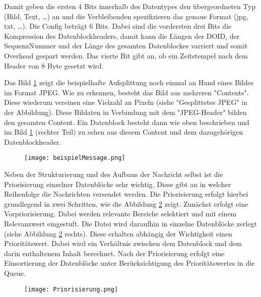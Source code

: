 Damit geben die ersten $4$ Bits innerhalb des Datentypes den übergeordneten Typ
(Bild, Text, \ldots) an und die Verbleibenden spezifizieren das genaue Format
(jpg, txt, \ldots). Die Config beträgt $6$ Bits. Dabei sind die vordersten drei
Bits die Kompression des Datenblockheaders, damit kann die Längen der DOID, der
SequenzNummer und der Länge des gesamten Datenblockes varriert und somit
Overhead gespart werden. Das vierte Bit gibt an, ob ein Zeitstempel nach dem
Header von $8$ Byte gesetzt wird.



Das Bild \ref{fig:beispielJPG} zeigt die beispielhafte Aufsplittung noch einmal
an Hand eines Bildes im Format JPEG. Wie zu erkennen, besteht das Bild aus
mehreren "Contents". Diese wiederum vereinen eine Vielzahl an Pixeln (siehe
"Gesplittetes JPEG" in der Abbildung). Diese Bildaten in Verbindung mit dem
"JPEG-Header" bilden den gesamten Content. Ein Datenblock besteht dann wie oben
beschrieben und im Bild \ref{fig:beispielJPG} (rechter Teil) zu sehen aus diesem
Content und dem dazugehörigen Datenblockheader.

\begin{figure}[H]
	\centering
	\texttt{[image: beispielMessage.png]}
	\label{fig:beispielJPG}
\end{figure}

Neben der Strukturierung und des Aufbaus der Nachricht selbst ist die
Priorisierung einzelner Datenblöcke sehr wichtig. Diese gibt an in welcher
Reihenfolge die Nachrichten versendet werden. Die Priorisierung erfolgt hierbei
grundlegend in zwei Schritten, wie die Abbildung \ref{fig:priorisierungen}
zeigt.
Zunächst erfolgt eine Vorpriorisierung. Dabei werden relevante Bereiche
selektiert und mit einem Relevanzwert eingestuft. Die
Datei wird daraufhin in einzelne Datenblöcke zerlegt (siehe Abbildung
\ref{fig:priorisierungen} rechts). Diese erhalten abhängig der Wichtigkeit einen
Prioritätswert. Dabei wird ein Verhältnis zwischen dem Datenblock und dem darin
enthaltenem Inhalt berechnet. Nach der Priorisierung erfolgt eine Einsortierung
der Datenblöcke unter Berücksichtigung des Prioritätswertes in die Queue.

\begin{figure}[H]
	\centering
	\texttt{[image: Priorisierung.png]}
	\label{fig:priorisierungen}
\end{figure}

